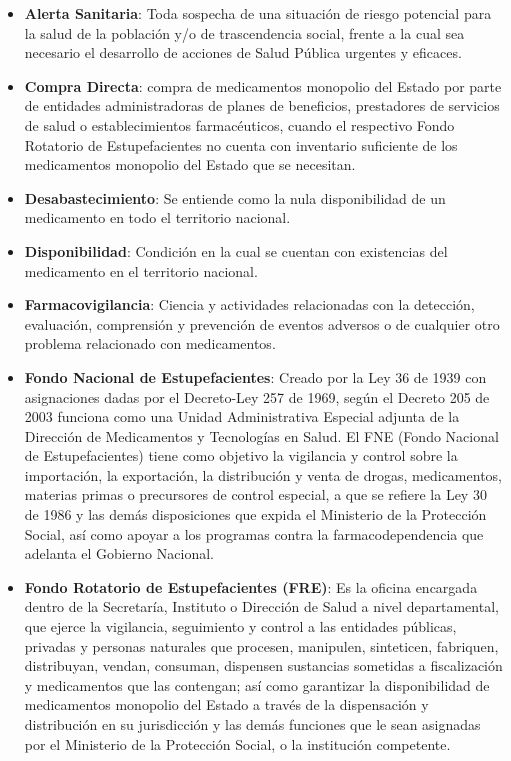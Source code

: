 \documentclass[
]{book}
\begin{document}
\begin{itemize}
\item
  \textbf{Alerta Sanitaria}: Toda sospecha de una situación de riesgo potencial para la salud de la población y/o de trascendencia social, frente a la cual sea necesario el desarrollo de acciones de Salud Pública urgentes y eficaces.
\item
  \textbf{Compra Directa}: compra de medicamentos monopolio del Estado por parte de entidades administradoras de planes de beneficios, prestadores de servicios de salud o establecimientos farmacéuticos, cuando el respectivo Fondo Rotatorio de Estupefacientes no cuenta con inventario suficiente de los medicamentos monopolio del Estado que se necesitan.
\item
  \textbf{Desabastecimiento}: Se entiende como la nula disponibilidad de un medicamento en todo el territorio nacional.
\item
  \textbf{Disponibilidad}: Condición en la cual se cuentan con existencias del medicamento en el territorio nacional.
\item
  \textbf{Farmacovigilancia}: Ciencia y actividades relacionadas con la detección, evaluación, comprensión y prevención de eventos adversos o de cualquier otro problema relacionado con medicamentos.
\item
  \textbf{Fondo Nacional de Estupefacientes}: Creado por la Ley 36 de 1939 con asignaciones dadas por el Decreto-Ley 257 de 1969, según el Decreto 205 de 2003 funciona como una Unidad Administrativa Especial adjunta de la Dirección de Medicamentos y Tecnologías en Salud. El FNE (Fondo Nacional de Estupefacientes) tiene como objetivo la vigilancia y control sobre la importación, la exportación, la distribución y venta de drogas, medicamentos, materias primas o precursores de control especial, a que se refiere la Ley 30 de 1986 y las demás disposiciones que expida el Ministerio de la Protección Social, así como apoyar a los programas contra la farmacodependencia que adelanta el Gobierno Nacional.
\item
  \textbf{Fondo Rotatorio de Estupefacientes (FRE)}: Es la oficina encargada dentro de la Secretaría, Instituto o Dirección de Salud a nivel departamental, que ejerce la vigilancia, seguimiento y control a las entidades públicas, privadas y personas naturales que procesen, manipulen, sinteticen, fabriquen, distribuyan, vendan, consuman, dispensen sustancias sometidas a fiscalización y medicamentos que las contengan; así como garantizar la disponibilidad de medicamentos monopolio del Estado a través de la dispensación y distribución en su jurisdicción y las demás funciones que le sean asignadas por el Ministerio de la Protección Social, o la institución competente.

\end{itemize}
\end{document}
